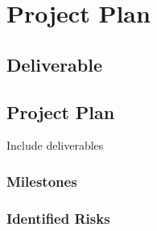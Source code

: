 \chapter{Project Plan}
\section{Deliverable}
\section{Project Plan}
Include deliverables
\subsection{Milestones}
\subsection{Identified Risks}